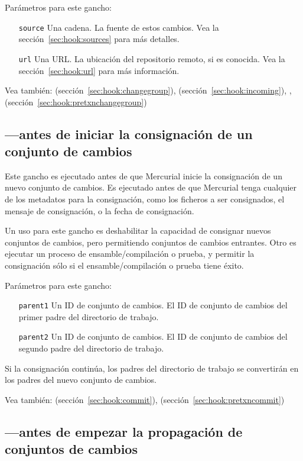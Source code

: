 Parámetros para este gancho:
\begin{itemize}
\item[\texttt{source}] Una cadena. La fuente de estos cambios. Vea la
  sección~\ref{sec:hook:sources} para más detalles.
\item[\texttt{url}] Una URL. La ubicación del repositorio remoto, si
  es conocida. Vea la sección~\ref{sec:hook:url} para más información.
\end{itemize}

Vea también:  (sección~\ref{sec:hook:changegroup}),
 (sección~\ref{sec:hook:incoming}), ,
 (sección~\ref{sec:hook:pretxnchangegroup})

\subsection{---antes de iniciar la consignación de un
conjunto de cambios}
\label{sec:hook:precommit}

Este gancho es ejecutado antes de que Mercurial inicie la consignación
de un nuevo conjunto de cambios. Es ejecutado antes de que Mercurial
tenga cualquier de los metadatos para la consignación, como los
ficheros a ser consignados, el mensaje de consignación, o la fecha de
consignación.

Un uso para este gancho es deshabilitar la capacidad de consignar
nuevos conjuntos de cambios, pero permitiendo conjuntos de cambios
entrantes. Otro es ejecutar un proceso de ensamble/compilación o
prueba, y permitir la consignación sólo si el ensamble/compilación o
prueba tiene éxito.

Parámetros para este gancho:
\begin{itemize}
  \item[\texttt{parent1}] Un ID de conjunto de cambios. El ID de
  conjunto de cambios del primer padre del directorio de trabajo.
\item[\texttt{parent2}] Un ID de conjunto de cambios. El ID de
  conjunto de cambios del segundo padre del directorio de trabajo.
\end{itemize}
Si la consignación continúa, los padres del directorio de trabajo se
convertirán en los padres del nuevo conjunto de cambios.

Vea también:  (sección~\ref{sec:hook:commit}),
 (sección~\ref{sec:hook:pretxncommit})

\subsection{---antes de empezar la propagación de
conjuntos de cambios}
\label{sec:hook:preoutgoing}

